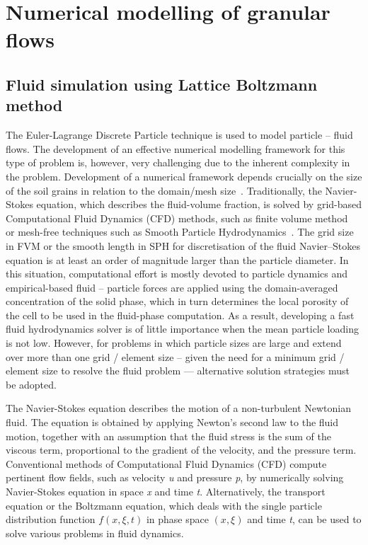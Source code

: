 
\chapter{Numerical modelling of granular flows}

\ifpdf
    \graphicspath{{Chapter3/figs/raster/}{Chapter3/figs/pdf/}{Chapter3/figs/}}
\else
    \graphicspath{{Chapter3/figs/vector/}{Chapter3/figs/}}
\fi


\section{Fluid simulation using Lattice Boltzmann method}

The Euler-Lagrange Discrete Particle technique is used to model particle -- 
fluid flows. The development of an effective numerical modelling framework for 
this type of problem is, however, very challenging due to the inherent 
complexity in the problem. Development of a numerical framework depends 
crucially on the size of the soil grains in relation to the domain/mesh 
size~\citep{Feng2007}. Traditionally, the Navier-Stokes equation, which 
describes the fluid-volume fraction, is solved by grid-based Computational 
Fluid Dynamics (CFD) methods, such as finite volume 
method~\citep{Capecelatro2013} or mesh-free techniques such as Smooth Particle 
Hydrodynamics~\citep{Sun2013}. The grid size in FVM or the smooth length in SPH 
for discretisation of the fluid Navier–Stokes equation is at least an order of 
magnitude larger than the particle diameter. In this situation, computational 
effort is mostly devoted to particle dynamics and empirical-based fluid -- 
particle forces are applied using the domain-averaged concentration of the 
solid phase, which in turn determines the local porosity of the cell to be used 
in the fluid-phase computation. As a result, developing a fast fluid 
hydrodynamics solver is of little importance when the mean particle loading is 
not low.  However, for problems in which particle sizes are large and extend 
over more than one grid / element size -- given the need for a minimum grid / 
element size to resolve the fluid problem — alternative solution strategies 
must be adopted.  
 
The Navier-Stokes equation describes the motion of a non-turbulent Newtonian 
fluid. The equation is obtained by applying Newton's second law to the fluid
motion, together with an assumption that the fluid stress is the sum of the 
viscous term, proportional to the gradient of the velocity, and the pressure 
term. Conventional methods of Computational Fluid Dynamics (CFD) compute 
pertinent flow fields, such as velocity \textit{u} and pressure \textit{p}, by 
numerically solving Navier-Stokes equation in space \textit{x} and time 
\textit{t}. Alternatively, the transport equation or the Boltzmann equation, 
which deals with the single particle distribution function $f(x,\xi,t)$ in 
phase space $(x,\xi)$ and time \textit{t}, can be used to solve various 
problems in fluid dynamics. 

